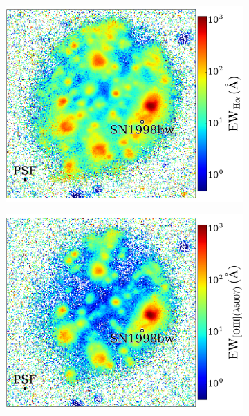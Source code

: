 \documentclass[traditabstract, referee]{aa}
\begin{document}
\begin{figure}
\begin{subfigure}{.242\textwidth}
  \includegraphics[width=1.0\linewidth]{Figs/MUSE_SN1998bw_HaEW.pdf}
\end{subfigure}
\begin{subfigure}{.242\textwidth}
  \includegraphics[width=1.0\linewidth]{Figs/MUSE_SN1998bw_OIIIEW.pdf}
\end{subfigure}
\begin{subfigure}{.243\textwidth}

\end{subfigure}
\end{figure}
\end{document}
